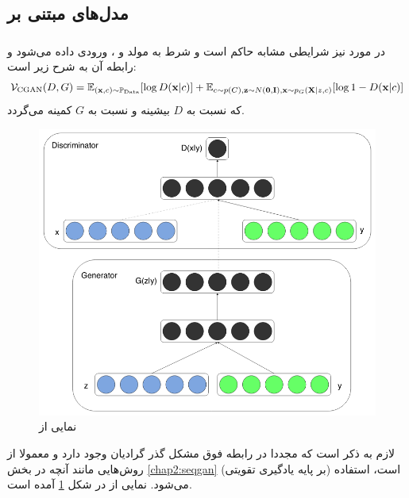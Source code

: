\subsection{مدل‌های مبتنی بر \gan{}}
\subsubsection{\cgan{}}
در مورد\gan{} نیز شرایطی مشابه \cvae{} حاکم است و شرط به مولد و \discriminator{}، ورودی داده می‌شود \cite{cgan} و رابطه آن به شرح زیر است:
\begin{align}
	{\mathcal{V}}_\text{CGAN}(D, G) =
	\mathbb E_{({\bf x}, c) \sim \mathbb P_\text{Data}} [\log D({\bf x}|c)] +
	\mathbb E_{c \sim p(C), {\bf z} \sim N({\bf 0}, {\bf I}),{\bf x} \sim p_G({\bf X}|z,c)} [\log 1 - D({\bf x}|c)]
\end{align}
که نسبت به $D$ بیشینه و نسبت به $G$ کمینه می‌گردد.
\begin{figure}[H]
	\centering
	\includegraphics[width=.7\textwidth]{images/cgan.png}
	\caption{نمایی از \cgan{} \cite{cgan}}
    \label{fig:chap2:cgan}
\end{figure}
لازم به ذکر است که مجددا در رابطه فوق مشکل گذر گرادیان وجود دارد و معمولا از روش‌هایی مانند آنچه در بخش \ref{chap2:seqgan} (بر پایه یادگیری تقویتی) است، استفاده می‌شود. نمایی از \cgan{} در شکل \ref{fig:chap2:cgan} آمده است.

